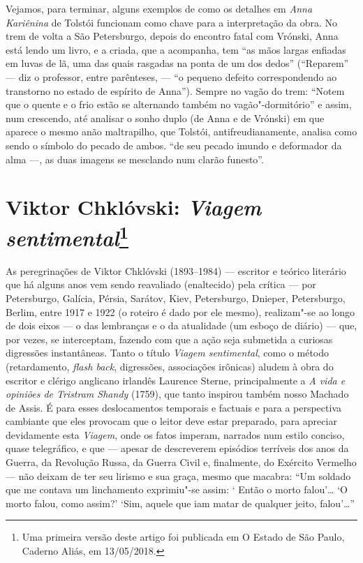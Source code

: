Vejamos, para terminar, alguns exemplos de como os detalhes em
\emph{Anna Kariênina} de Tolstói funcionam como chave para a
interpretação da obra. No trem de volta a São Petersburgo, depois do
encontro fatal com Vrónski, Anna está lendo um livro, e a criada, que a
acompanha, tem ``as mãos largas enfiadas em luvas de lã, uma das quais
rasgadas na ponta de um dos dedos'' (``Reparem'' --- diz o
professor, entre parênteses, --- ``o pequeno defeito
correspondendo ao transtorno no estado de espírito de Anna'').
Sempre no vagão do trem: ``Notem que o quente e o frio estão se
alternando também no vagão"-dormitório'' e assim, num crescendo, até
analisar o sonho duplo (de Anna e de Vrónski) em que aparece o mesmo
anão maltrapilho, que Tolstói, antifreudianamente, analisa como sendo o
símbolo do pecado de ambos. ``de seu pecado imundo e deformador da alma
---, as duas imagens se mesclando num clarão funesto''.

\chapter{Viktor Chklóvski: \emph{Viagem sentimental}\footnote{Uma primeira versão deste artigo foi publicada em O Estado de São Paulo, Caderno Aliás,  em 13/05/2018.}}

As peregrinações de Viktor Chklóvski (1893--1984) --- escritor e teórico
literário que há alguns anos vem sendo reavaliado (enaltecido) pela
crítica --- por Petersburgo, Galícia, Pérsia, Sarátov, Kiev,
Petersburgo, Dnieper, Petersburgo, Berlim, entre 1917 e 1922 (o roteiro
é dado por ele mesmo), realizam"-se ao longo de dois eixos --- o das
lembranças e o da atualidade (um esboço de diário) --- que, por vezes,
se interceptam, fazendo com que a ação seja submetida a curiosas
digressões instantâneas. Tanto o título \emph{Viagem sentimental}, como
o método (retardamento, \emph{flash back}, digressões, associações
irônicas) aludem à obra do escritor e clérigo anglicano irlandês
Laurence Sterne, principalmente a \emph{A vida e opiniões de Tristram
Shandy} (1759), que tanto inspirou também nosso Machado de Assis. É para
esses deslocamentos temporais e factuais e para a perspectiva cambiante
que eles provocam que o leitor deve estar preparado, para apreciar
devidamente esta \emph{Viagem}, onde os fatos imperam, narrados num
estilo conciso, quase telegráfico, e que --- apesar de descreverem
episódios terríveis dos anos da  Guerra, da Revolução Russa, da Guerra
Civil e, finalmente, do Exército Vermelho --- não deixam de ter seu
lirismo e sua graça, mesmo que macabra: ``Um soldado que me contava um
linchamento exprimiu"-se assim: ` Então o morto falou'\ldots{} `O morto falou,
como assim?' `Sim, aquele que iam matar de qualquer jeito, falou'\ldots{}''

